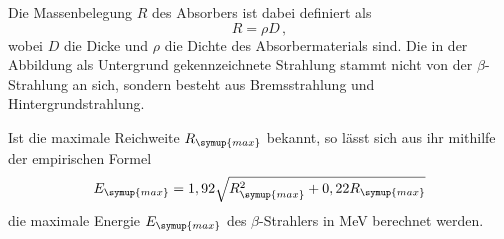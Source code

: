 Die Massenbelegung $R$ des Absorbers ist dabei definiert als
\begin{equation}
  R=\rho D \,,
\end{equation}
wobei $D$ die Dicke und $\rho$ die Dichte des Absorbermaterials sind. Die in der Abbildung
als Untergrund gekennzeichnete Strahlung stammt nicht von der $\beta$-Strahlung an sich,
sondern besteht aus Bremsstrahlung und Hintergrundstrahlung.

Ist die maximale Reichweite $R_{\symup{max}}$ bekannt, so lässt sich aus ihr mithilfe
der empirischen Formel
\begin{equation}
  E_{\symup{max}}=1,92 \sqrt{R_{\symup{max}}^2+0,22 R_{\symup{max}}}
\end{equation}
die maximale Energie $E_{\symup{max}}$ des $\beta$-Strahlers in MeV berechnet werden.
